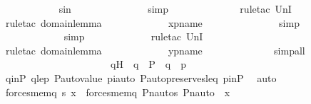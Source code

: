 \begin{isabellebody}
\ \ \ \ \ \ \ \ \ \ \isamarkupfalse%
\ sin\ \isanewline
\ \ \ \ \ \ \ \ \ \ \ \ \isamarkupfalse%
\ simp\ \isanewline
\ \ \ \ \ \ \ \ \ \ \ \isamarkupfalse%
\ {\isacharparenleft}{\kern0pt}rule{\isacharunderscore}{\kern0pt}tac\ UnI{}{\isacharparenright}{\kern0pt}\ \isanewline
\ \ \ \ \ \ \ \ \ \ \ \isamarkupfalse%
\ {\isacharparenleft}{\kern0pt}rule{\isacharunderscore}{\kern0pt}tac\ domain{\isacharunderscore}{\kern0pt}lemma{\isacharparenright}{\kern0pt}\ \isanewline
\ \ \ \ \ \ \ \ \ \ \isamarkupfalse%
\ xpname\ \isanewline
\ \ \ \ \ \ \ \ \ \ \ \ \isamarkupfalse%
\ simp\ \isanewline
\ \ \ \ \ \ \ \ \ \ \ \isamarkupfalse%
\ simp\ \isanewline
\ \ \ \ \ \ \ \ \ \ \isamarkupfalse%
\ {\isacharparenleft}{\kern0pt}rule{\isacharunderscore}{\kern0pt}tac\ UnI{}{\isacharparenright}{\kern0pt}\ \isanewline
\ \ \ \ \ \ \ \ \ \ \isamarkupfalse%
\ {\isacharparenleft}{\kern0pt}rule{\isacharunderscore}{\kern0pt}tac\ domain{\isacharunderscore}{\kern0pt}lemma{\isacharparenright}{\kern0pt}\ \isanewline
\ \ \ \ \ \ \ \ \ \ \isamarkupfalse%
\ ypname\ \isanewline
\ \ \ \ \ \ \ \ \ \ \ \isamarkupfalse%
\ simp{\isacharunderscore}{\kern0pt}all\ \isanewline
\ \ \ \ \ \ \ \ \ \ \isamarkupfalse%
\ \isanewline
\isanewline
\ \ \ \ \ \ \ \ \isamarkupfalse%
\ q{\isacharprime}{\kern0pt}H\ {\isacharcolon}{\kern0pt}\ {\isachardoublequoteopen}{\isasympi}{\isacharbackquote}{\kern0pt}q\ {\isasymin}\ P\ {\isasymand}\ {\isasympi}{\isacharbackquote}{\kern0pt}q\ {\isasympreceq}\ {\isasympi}{\isacharbackquote}{\kern0pt}p{\isachardoublequoteclose}\ \isanewline
\ \ \ \ \ \ \ \ \ \ \isamarkupfalse%
\ qinP\ qlep\ P{\isacharunderscore}{\kern0pt}auto{\isacharunderscore}{\kern0pt}value\ piauto\ P{\isacharunderscore}{\kern0pt}auto{\isacharunderscore}{\kern0pt}preserves{\isacharunderscore}{\kern0pt}leq\ pinP\ \isamarkupfalse%
\ auto\ \isanewline
\isanewline
\ \ \ \ \ \ \ \ \isamarkupfalse%
\ {\isachardoublequoteopen}forces{\isacharunderscore}{\kern0pt}mem{\isacharparenleft}{\kern0pt}q{\isacharcomma}{\kern0pt}\ s{\isacharcomma}{\kern0pt}\ x{\isacharparenright}{\kern0pt}\ {\isasymlongleftrightarrow}\ forces{\isacharunderscore}{\kern0pt}mem{\isacharparenleft}{\kern0pt}{\isasympi}{\isacharbackquote}{\kern0pt}q{\isacharcomma}{\kern0pt}\ Pn{\isacharunderscore}{\kern0pt}auto{\isacharparenleft}{\kern0pt}{\isasympi}{\isacharparenright}{\kern0pt}{\isacharbackquote}{\kern0pt}s{\isacharcomma}{\kern0pt}\ Pn{\isacharunderscore}{\kern0pt}auto{\isacharparenleft}{\kern0pt}{\isasympi}{\isacharparenright}{\kern0pt}\ {\isacharbackquote}{\kern0pt}\ x{\isacharparenright}{\kern0pt}{\isachardoublequoteclose}\ \isanewline

\end{isabellebody}
